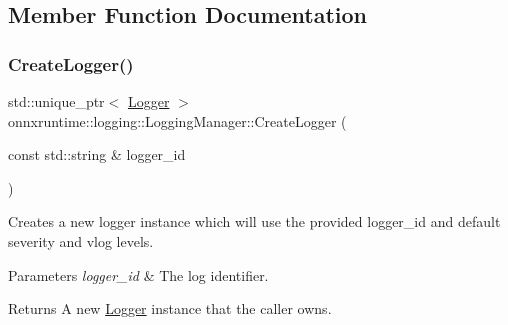 \subsection{Member Function Documentation}
\mbox{\label{classonnxruntime_1_1logging_1_1LoggingManager_a0060fb2bb4d5830fce54cf312ce308bb}} 
\subsubsection{\texorpdfstring{Create\+Logger()}{CreateLogger()}\hspace{0.1cm}{\footnotesize\ttfamily [1/2]}}
{\footnotesize\ttfamily std\+::unique\+\_\+ptr$<$ \mbox{\hyperlink{classonnxruntime_1_1logging_1_1Logger}{Logger}} $>$ onnxruntime\+::logging\+::\+Logging\+Manager\+::\+Create\+Logger (\begin{DoxyParamCaption}\item[{const std\+::string \&}]{logger\+\_\+id }\end{DoxyParamCaption})}

Creates a new logger instance which will use the provided logger\+\_\+id and default severity and vlog levels. 
\begin{DoxyParams}{Parameters}
{\em logger\+\_\+id} & The log identifier. \\
\hline
\end{DoxyParams}
\begin{DoxyReturn}{Returns}
A new \mbox{\hyperlink{classonnxruntime_1_1logging_1_1Logger}{Logger}} instance that the caller owns. 
\end{DoxyReturn}
\mbox{\label{classonnxruntime_1_1logging_1_1LoggingManager_a9029481638625330691349c45085bf2b}} 
